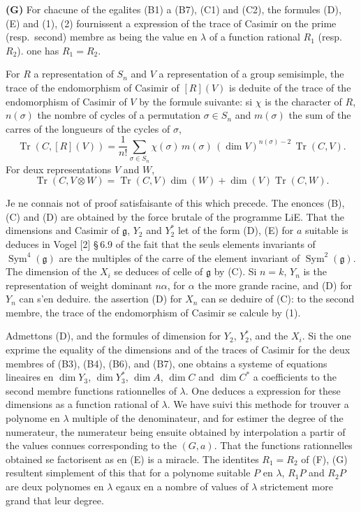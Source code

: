 \documentclass[11pt,a4paper]{article}
\DeclareMathOperator{\Sym}{Sym}
\DeclareMathOperator{\Tr}{Tr}
\newcommand{\frg}{\mathfrak{g}}
\begin{document}
\medskip
\noindent\textbf{(G)} For chacune of the egalites (B1) a (B7), (C1) and (C2), the formules (D), (E) and (1), (2) fournissent a expression of the trace of Casimir on the prime (resp.~second) membre as being the value en $\lambda$ of a function rational $R_1$ (resp.~$R_2$). one has $R_1 = R_2$.

\bigskip

For $R$ a representation of $S_n$ and $V$ a representation of a group semisimple, the trace of the endomorphism of Casimir of $[R](V)$ is deduite of the trace of the endomorphism of Casimir of $V$ by the formule suivante: si $\chi$ is the character of $R$, $n(\sigma)$ the nombre of cycles of a permutation $\sigma \in S_n$ and $m(\sigma)$ the sum of the carres of the longueurs of the cycles of $\sigma$,
\begin{equation}\label{eq:casimir-trace}
\Tr(C, [R](V)) = \frac{1}{n!} \sum_{\sigma \in S_n} \chi(\sigma) \, m(\sigma) \, (\dim V)^{n(\sigma)-2} \, \Tr(C, V).
\end{equation}
For deux representations $V$ and $W$,
\begin{equation}\label{eq:casimir-tensor}
\Tr(C, V \otimes W) = \Tr(C, V) \dim(W) + \dim(V) \Tr(C, W).
\end{equation}

Je ne connais not of proof satisfaisante of this which precede. The enonces (B), (C) and (D) are obtained by the force brutale of the programme LiE. That the dimensions and Casimir of $\frg$, $Y_2$ and $Y_2^*$ let of the form (D), (E) for $a$ suitable is deduces in Vogel [2] \S\,6.9 of the fait that the seuls elements invariants of $\Sym^4(\frg)$ are the multiples of the carre of the element invariant of $\Sym^2(\frg)$. The dimension of the $X_i$ se deduces of celle of $\frg$ by (C). Si $n = k$, $Y_n$ is the representation of weight dominant $n\alpha$, for $\alpha$ the more grande racine, and (D) for $Y_n$ can s'en deduire. the assertion (D) for $X_n$ can se deduire of (C): to the second membre, the trace of the endomorphism of Casimir se calcule by (1).

Admettons (D), and the formules of dimension for $Y_2$, $Y_2^*$, and the $X_i$. Si the one exprime the equality of the dimensions and of the traces of Casimir for the deux membres of (B3), (B4), (B6), and (B7), one obtains a systeme of equations lineaires en $\dim Y_3$, $\dim Y_3^*$, $\dim A$, $\dim C$ and $\dim C^*$ a coefficients to the second membre functions rationnelles of $\lambda$. One deduces a expression for these dimensions as a function rational of $\lambda$. We have suivi this methode for trouver a polynome en $\lambda$ multiple of the denominateur, and for estimer the degree of the numerateur, the numerateur being ensuite obtained by interpolation a partir of the values connues corresponding to the $(G, a)$. That the functions rationnelles obtained se factorisent as en (E) is a miracle. The identites $R_1 = R_2$ of (F), (G) resultent simplement of this that for a polynome suitable $P$ en $\lambda$, $R_1 P$ and $R_2 P$ are deux polynomes en $\lambda$ egaux en a nombre of values of $\lambda$ strictement more grand that leur degree.
\end{document}
